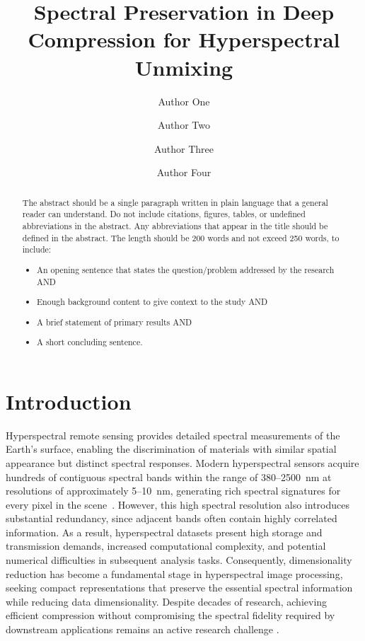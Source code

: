\documentclass{article}
\title{Spectral Preservation in Deep Compression for Hyperspectral Unmixing}
\author[1*$\dag$]{Author One}
\author[2$\dag$]{Author Two}
\author[2]{Author Three}
\author[1,2]{Author Four}
\affil[1]{Department of Physics, A University, City, Country.}
\affil[2]{Department of Astronomy, B University, City, Country.}
\affil[*]{Address correspondence to: email@email.com}
\affil[$\dag$]{These authors contributed equally to this work.}
\date{}
\begin{document}
\maketitle

\begin{abstract}
The abstract should be a single paragraph written in plain language that a general reader can understand. Do not include citations, figures, tables, or undefined abbreviations in the abstract. Any abbreviations that appear in the title should be defined in the abstract. The length should be 200 words and not exceed 250 words, to include:
\begin{itemize}
    \item An opening sentence that states the question/problem addressed by the research AND
    \item Enough background content to give context to the study AND
    \item A brief statement of primary results AND
    \item A short concluding sentence.
\end{itemize}
\end{abstract}




\section{Introduction}

Hyperspectral remote sensing provides detailed spectral measurements of the Earth's surface, enabling the discrimination of materials with similar spatial appearance but distinct spectral responses. Modern hyperspectral sensors acquire hundreds of contiguous spectral bands within the range of 380--2500~nm at resolutions of approximately 5--10~nm, generating rich spectral signatures for every pixel in the scene~\cite{gimenez2025hyperspectral, hong2026hyperspectral}. However, this high spectral resolution also introduces substantial redundancy, since adjacent bands often contain highly correlated information. As a result, hyperspectral datasets present high storage and transmission demands, increased computational complexity, and potential numerical difficulties in subsequent analysis tasks. Consequently, dimensionality reduction has become a fundamental stage in hyperspectral image processing, seeking compact representations that preserve the essential spectral information while reducing data dimensionality. Despite decades of research, achieving efficient compression without compromising the spectral fidelity required by downstream applications remains an active research challenge \cite{vaddi2024}.
\end{document}
